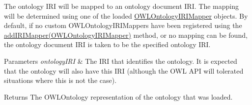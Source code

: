 The ontology I\-R\-I will be mapped to an ontology document I\-R\-I. The mapping will be determined using one of the loaded \hyperlink{}{O\-W\-L\-Ontology\-I\-R\-I\-Mapper} objects. By default, if no custom {\ttfamily O\-W\-L\-Ontology\-I\-R\-I\-Mapper}s have been registered using the \hyperlink{classuk_1_1ac_1_1manchester_1_1cs_1_1owl_1_1owlapi_1_1_o_w_l_ontology_manager_impl_adbd4885354966e0581b32cc6986495f9}{add\-I\-R\-I\-Mapper(\-O\-W\-L\-Ontology\-I\-R\-I\-Mapper)} method, or no mapping can be found, the ontology document I\-R\-I is taken to be the specified ontology I\-R\-I. 
\begin{DoxyParams}{Parameters}
{\em ontology\-I\-R\-I} & The I\-R\-I that identifies the ontology. It is expected that the ontology will also have this I\-R\-I (although the O\-W\-L A\-P\-I will tolerated situations where this is not the case). \\
\hline
\end{DoxyParams}
\begin{DoxyReturn}{Returns}
The {\ttfamily O\-W\-L\-Ontology} representation of the ontology that was loaded. 
\end{DoxyReturn}

